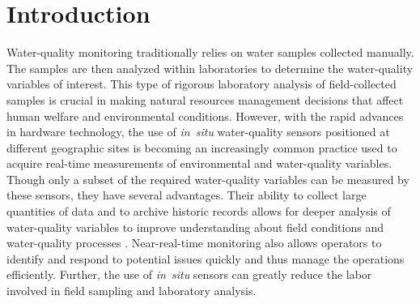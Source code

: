 \documentclass[draft]{agujournal2018} %
\begin{document}
%
%
%
%

\section{Introduction}\label{introduction}

Water-quality monitoring traditionally relies on water samples collected
manually. The samples are then analyzed within laboratories to determine
the water-quality variables of interest. This type of rigorous
laboratory analysis of field-collected samples is crucial in making
natural resources management decisions that affect human welfare and
environmental conditions. However, with the rapid advances in hardware
technology, the use of \emph{in~situ} water-quality sensors positioned
at different geographic sites is becoming an increasingly common
practice used to acquire real-time measurements of environmental and
water-quality variables. Though only a subset of the required
water-quality variables can be measured by these sensors, they have
several advantages. Their ability to collect large quantities of data
and to archive historic records allows for deeper analysis of
water-quality variables to improve understanding about field
conditions and water-quality processes \citep{glasgow2004real}.
Near-real-time monitoring also allows operators to identify and
respond to potential issues quickly and thus manage the operations
efficiently. Further, the use of \emph{in~situ} sensors can greatly
reduce the labor involved in field sampling and laboratory analysis.
\end{document}
